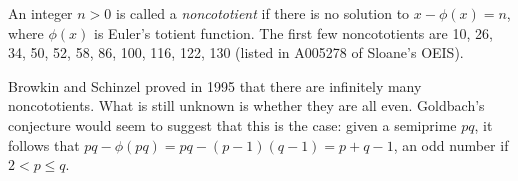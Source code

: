 \documentclass[12pt]{article}
\begin{document}
An integer $n > 0$ is called a {\it noncototient} if there is no solution
to $x - {\phi}(x) = n$, where ${\phi}(x)$ is Euler's totient function. The first few noncototients are 10, 26, 34, 50, 52, 58, 86, 100, 116, 122, 130 (listed in A005278 of Sloane's OEIS).

Browkin and Schinzel proved in 1995 that there are infinitely many noncototients. What is still unknown is whether they are all even. Goldbach's conjecture would seem to suggest that this is the case: given a semiprime $pq$, it follows that $pq - {\phi}(pq) = pq - (p - 1)(q - 1) = p + q - 1$, an odd number if $2 < p \le q$.
\end{document}
